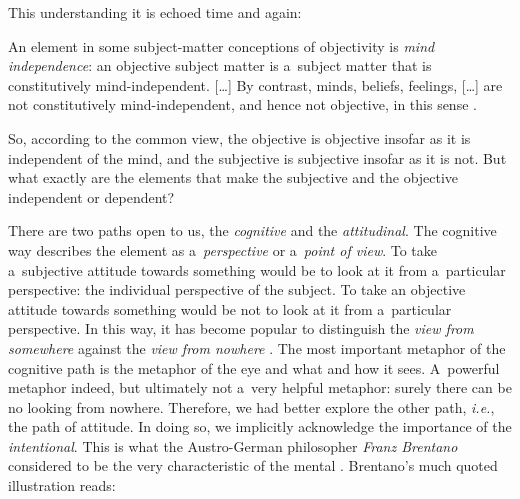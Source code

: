 This understanding it is echoed time and again:



An element in some subject-matter conceptions of objectivity is \textit{mind independence}: an objective subject matter is a~subject matter that is constitutively mind-independent. […] By contrast, minds, beliefs, feelings, […] are not constitutively mind-independent, and hence not objective, in this sense 
\parencite[][p.46]{burge_origins_2010}.%




So, according to the common view, the objective is objective insofar as it is independent of the mind, and the subjective is subjective insofar as it is not. But what exactly are the elements that make the subjective and the objective independent or dependent?



There are two paths open to us, the \textit{cognitive} and the \textit{attitudinal}. The cognitive way describes the element as a~\textit{perspective} or a~\textit{point of view}. To take a~subjective attitude towards something would be to look at it from a~particular perspective: the individual perspective of the subject. To take an objective attitude towards something would be not to look at it from a~particular perspective. In this way, it has become popular to distinguish the \textit{view from somewhere} against the \textit{view from nowhere} 
\parencite[cf.][]{nagel_subjective_1979}. %
 The most important metaphor of the cognitive path is the metaphor of the eye and what and how it sees. A~powerful metaphor indeed, but ultimately not a~very helpful metaphor: surely there can be no looking from nowhere. Therefore, we had better explore the other path, \textit{i.e.}, the path of attitude. In doing so, we implicitly acknowledge the importance of the \textit{intentional}. This is what the Austro-German philosopher \textit{Franz Brentano} considered to be the very characteristic of the mental 
\parencites[see, e.g.,][]{ohear_intentionality_1998}[][]{crane_elements_2001}[][]{crane_objects_2013}. %
 Brentano's much quoted illustration reads:



